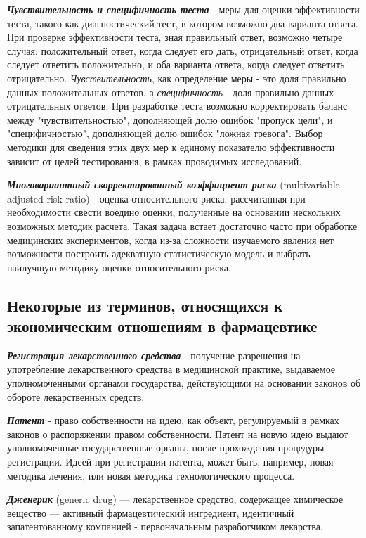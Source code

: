 \noindent
\textbf{ \textit{Чувствительность и специфичность теста} } - меры для оценки эффективности теста, такого как диагностический тест, в котором возможно два варианта ответа. При проверке эффективности теста, зная правильный ответ, возможно четыре случая: положительный ответ, когда следует его дать, отрицательный ответ, когда следует ответить положительно, и оба варианта ответа, когда следует ответить отрицательно. \textit{Чувствительность}, как определение меры - это доля правильно данных положительных ответов, а \textit{специфичность} - доля правильно данных отрицательных ответов. При разработке теста возможно корректировать баланс между "чувствительностью", дополняющей долю ошибок "пропуск цели", и "специфичностью", дополняющей долю ошибок "ложная тревога". Выбор методики для сведения этих двух мер к единому показателю эффективности зависит от целей тестирования, в рамках проводимых исследований.

\noindent
\textbf{ \textit{Многовариантный скорректированный коэффициент риска} } (multivariable adjusted risk ratio) - оценка относительного риска, рассчитанная при необходимости свести воедино оценки, полученные на основании нескольких возможных методик расчета. Такая задача встает достаточно часто при обработке медицинских экспериментов, когда из-за сложности изучаемого явления нет возможности построить адекватную статистическую модель и выбрать наилучшую методику оценки относительного риска.

\subsection{Некоторые из терминов, относящихся к экономическим отношениям в фармацевтике}

\noindent
\textbf{ \textit{Регистрация лекарственного средства} } - получение разрешения на употребление лекарственного средства в медицинской практике, выдаваемое уполномоченными органами государства, действующими на основании законов об обороте лекарственных средств.

\noindent
\textbf{ \textit{Патент} } - право собственности на идею, как объект, регулируемый в рамках законов о распоряжении правом собственности. Патент на новую идею выдают уполномоченные государственные органы, после прохождения процедуры регистрации. Идеей при регистрации патента, может быть, например, новая методика лечения, или новая методика технологического процесса.

\noindent
\textbf{ \textit{Дженерик} } (generic drug) — лекарственное средство, содержащее химическое вещество — активный фармацевтический ингредиент, идентичный запатентованному компанией - первоначальным разработчиком лекарства.


